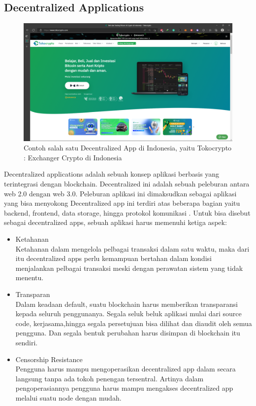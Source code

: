 \subsection{Decentralized Applications}
\label{subsec:dapps}

\begin{figure}[htp!]
\centering
\includegraphics[scale=0.2]{gambar/tokocrypto.png}
\caption{Contoh salah satu Decentralized App di Indonesia, yaitu Tokocrypto : Exchanger Crypto di Indonesia}
\label{fig:tokocrypto}
\end{figure}

Decentralized applications adalah sebuah konsep aplikasi berbasis yang terintegrasi dengan blockchain. Decentralized ini adalah sebuah peleburan antara web 2.0 dengan web 3.0. Peleburan aplikasi ini dimaksudkan sebagai aplikasi yang bisa menyokong Decentralized app ini terdiri atas beberapa bagian yaitu backend, frontend, data storage, hingga protokol komunikasi \cite{MasteringEthGavinWood}. Untuk bisa disebut sebagai decentralized apps, sebuah aplikasi harus memenuhi ketiga aspek:

\begin{itemize}
\item{Ketahanan}
\\ Ketahanan dalam mengelola pelbagai transaksi dalam satu waktu, maka dari itu decentralized apps perlu kemampuan bertahan dalam kondisi menjalankan pelbagai transaksi meski dengan perawatan sistem yang tidak menentu.
\item{Transparan}
\\ Dalam keadaan default, suatu blockchain harus memberikan transparansi kepada seluruh penggunanya. Segala seluk beluk aplikasi mulai dari source code, kerjasama,hingga segala persetujuan bisa dilihat dan diaudit oleh semua pengguna. Dan segala bentuk perubahan harus disimpan di blockchain itu sendiri.
\item{Censorship Resistance}
\\ Pengguna harus mampu mengoperasikan decentralized app dalam secara langsung tanpa ada tokoh penengan tersentral. Artinya dalam pengoperasiannya pengguna harus mampu mengakses decentralized app melalui suatu node dengan mudah.
\end{itemize}

